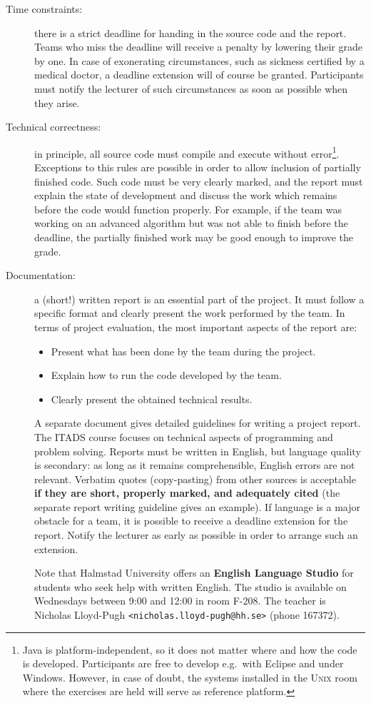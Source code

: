\documentclass[a4paper,10pt]{article}
\begin{document}
\begin{description}

\item[Time constraints:]
  there is a strict deadline for handing in the source code and the report.
  Teams who miss the deadline will receive a penalty by lowering their grade by one.
  In case of exonerating circumstances, such as sickness certified by a medical doctor, a deadline extension will of course be granted.
  Participants must notify the lecturer of such circumstances as soon as possible when they arise.
  
\item[Technical correctness:]
  in principle, all source code must compile and execute without error\footnote{
    Java is platform-independent, so it does not matter where and how the code is developed.
    Participants are free to develop e.g.\ with Eclipse and under Windows.
    However, in case of doubt, the systems installed in the \textsc{Unix} room where the exercises are held will serve as reference platform.}.
  Exceptions to this rules are possible in order to allow inclusion of partially finished code.
  Such code must be very clearly marked, and the report must explain the state of development and discuss the work which remains before the code would function properly.
  For example, if the team was working on an advanced algorithm but was not able to finish before the deadline, the partially finished work may be good enough to improve the grade.
  
\item[Documentation:]
  a (short!) written report is an essential part of the project.
  It must follow a specific format and clearly present the work performed by the team.
  In terms of project evaluation, the most important aspects of the report are:
  \begin{itemize}
  \item Present what has been done by the team during the project.
  \item Explain how to run the code developed by the team.
  \item Clearly present the obtained technical results.
  \end{itemize}
  A separate document gives detailed guidelines for writing a project report.
  The ITADS course focuses on technical aspects of programming and problem solving.
  Reports must be written in English, but language quality is secondary: as long as it remains comprehensible, English errors are not relevant.
  Verbatim quotes (copy-pasting) from other sources is acceptable \textbf{if they are short, properly marked, and adequately cited} (the separate report writing guideline gives an example).
  If language is a major obstacle for a team, it is possible to receive a deadline extension for the report.
  Notify the lecturer as early as possible in order to arrange such an extension.
  
  Note that Halmstad University offers an \textbf{English Language Studio} for students who seek help with written English.
  The studio is available on Wednesdays between 9:00 and 12:00 in room F-208.
  The teacher is Nicholas Lloyd-Pugh \texttt{<nicholas.lloyd-pugh@hh.se>} (phone 167372).
  
\end{description}
\end{document}
